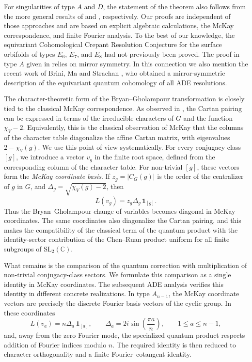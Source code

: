 \documentclass[a4paper,reqno]{amsart}
\theoremstyle{plain} %
\theoremstyle{definition} %
\theoremstyle{remark} %
\newcommand{\fo}{\mathbf{1}}
\newcommand{\1}{\mathds{1}}   %
\begin{document}
For singularities of type $A$ and $D$, the statement of the theorem also follows from the more general results of 
\cite{CCIT09} and \cite{Hu13}, respectively. Our proofs are independent of those approaches and are based on 
explicit algebraic calculations, the McKay correspondence, and finite Fourier analysis. 
To the best of our knowledge, the equivariant Cohomological Crepant Resolution Conjecture for the surface orbifolds of types 
\(E_6\), \(E_7\), and \(E_8\) had not previously been proved. The proof in type \(A\) given in \cite{CCIT09} 
relies on mirror symmetry. In this connection we also mention the recent work of Brini, Ma and Strachan 
\cite{BMS25}, who obtained a mirror-symmetric description of the equivariant quantum cohomology of all ADE resolutions.

The character-theoretic form of the Bryan--Gholampour transformation is
closely tied to the classical McKay correspondence. As observed in
\cite[Sec.~5]{bryan2008root}, the Cartan pairing can be expressed in terms of
the irreducible characters of $G$ and the function $\chi_V-2$. Equivalently,
this is the classical observation of McKay \cite{McKay} that the columns of
the character table diagonalize the affine Cartan matrix, with eigenvalues
$2-\chi_V(g)$. We use this point of view systematically.
For every conjugacy class \([g]\), we introduce a vector \(v_g\) in the finite root space, 
defined from the corresponding column of the character table. 
For non-trivial \([g]\), these vectors form the 
 \textit{McKay coordinate basis}. If
$z_g=|C_G(g)|$ is the order of the centralizer of $g$ in $G$, and $\Delta_g=\sqrt{\chi_V(g)-2}$, then
\[
L(v_g)=z_g\Delta_g\,\fo_{[g]}.
\]
Thus the Bryan--Gholampour change of variables becomes diagonal in McKay
coordinates. The same coordinates also diagonalize the Cartan pairing, and
this makes the compatibility of the classical term of the quantum product
with the identity-sector contribution of the Chen--Ruan product uniform for
all finite subgroups of $\mathrm{SL}_2(\mathbb C)$.

What remains is the comparison of the quantum correction with multiplication
of non-trivial conjugacy-class sectors. We formulate this comparison as a
single identity in McKay coordinates. The subsequent ADE analysis verifies
this identity in different concrete realizations. In type $A_{n-1}$, the
McKay coordinate vectors are precisely the discrete Fourier basis vectors of the cyclic
group. In these coordinates
\[
L(v_a)=n\Delta_a\,\fo_{[a]},
\qquad
\Delta_a=2i\sin\left(\frac{\pi a}{n}\right), \qquad 1\le a\le n-1,
\]
and, away from the zero Fourier mode, the specialized quantum product respects
addition of Fourier indices modulo $n$. The required identity is then reduced
to character orthogonality and a finite Fourier--cotangent identity.
\end{document}
